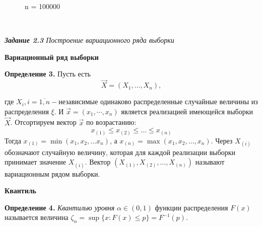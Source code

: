 \documentclass[a4paper,12pt, oneside]{book}
\begin{document}
\begin{figure}[h!]
\begin{center}
\begin{minipage}[h]{0.47\linewidth}
	\end{minipage}
	\hfill
	\begin{minipage}[h]{0.47\linewidth}
		 n = 100000 \\
	\end{minipage}
	\end{center}
\end{figure}



\newpage
{}\\
\vspace{5mm}


\newpage
{\large\textit{\textbf{Задание 2.3} Построение вариационного ряда выборки}}

\vspace{5mm}
\large{\textbf{Вариационный ряд выборки}}
\vspace{5mm}

\normalsize{\textbf{Определение 3.}} Пусть есть 
$$
\vec{X} = (X_1, \ldots , X_n),
$$

где $X_i, i=\overline{1,n} - $независимые одинаково распределенные случайные величины из распределения $\xi$. И $\vec{x} = (x_1, \cdots, x_n)$ является реализацией
имеющейся выборки $\vec{X}$. Отсортируем вектор $\vec{x}$ по возрастанию:
$$
x_{(1)} \leq x_{(2)} \leq \ldots \leq x_{(n)}
$$
Тогда $x_{(1)} = \min(x_1, x_2, \ldots x_n)$, а $x_{(n)} = \max(x_1, x_2, \ldots, x_n)$. Через $X_{(i)}$ 
обозначают случайную величину, которая для каждой реализации выборки
принимает значение $X_{(i)}$. Вектор $(X_{(1)}, X_{(2)}, \ldots, X_{(n)})$ называют вариационным рядом выборки.

\vspace{5mm}
\large{\textbf{Квантиль}}
\vspace{5mm}

\normalsize{\textbf{Определение 4.}} \textit{Квантилью уровня} $\alpha \in (0, 1)$ функции распределения $F(x)$ называется величина $\zeta_\alpha = \sup\{ x: F(x) \leq p \} = F^{-1}(p)$.
\end{document}

